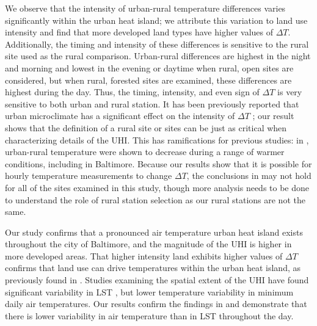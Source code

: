 We observe that the intensity of urban-rural temperature differences varies significantly within the urban heat island; we attribute this variation to land use intensity and find that more developed land types have higher values of $\Delta T$.  
Additionally, the timing and intensity of these differences is sensitive to the rural site used as the rural comparison.
Urban-rural differences are highest in the night and morning and lowest in the evening or daytime when rural, open sites are considered, but when rural, forested sites are examined, these differences are highest during the day. 
Thus, the timing, intensity, and even sign of $\Delta T$ is very sensitive to both urban and rural station. 
It has been previously reported that urban microclimate has a significant effect on the intensity of $\Delta T$ \citep{lcz};  our result shows that the definition of a rural site or sites can be just as critical when characterizing details of the UHI.
This has ramifications for previous studies: in \cite{scott2018reduced}, urban-rural temperature were shown to decrease during a range of warmer conditions, including in Baltimore. 
 Because our results show that it is possible for hourly temperature measurements to change  
$\Delta T$, the conclusions in \cite{scott2018reduced} may not hold for all of the sites examined in this study, though more analysis needs to be done to understand the role of rural station selection as our rural stations are not the same.

Our study confirms that a pronounced air temperature urban heat island exists throughout the city of Baltimore, and the magnitude of the UHI is higher in more developed areas.
That higher intensity land exhibits higher values of $\Delta T$ confirms that land use can drive temperatures within the urban heat island, as previously found in \cite{Huang20111753,Boug10}. 
 Studies examining the spatial extent of the UHI have found significant variability in LST \citep{Huang20111753}, but lower temperature variability in minimum daily air temperatures. 
Our results confirm the findings in \cite{scott2017intraurban} and demonstrate that there is lower variability in air temperature than in LST throughout the day. 

